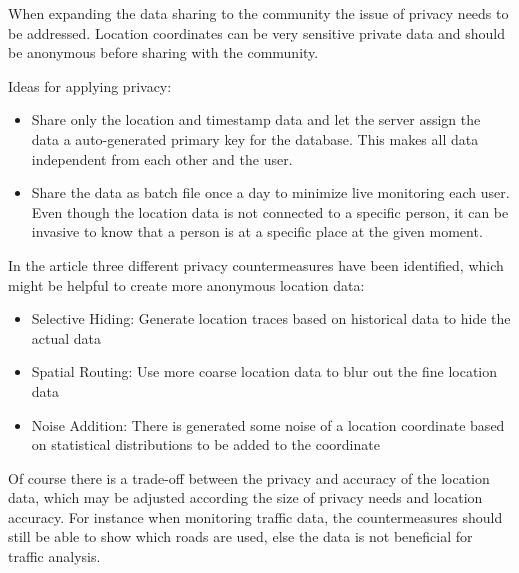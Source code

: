 When expanding the data sharing to the community the issue of privacy needs to be addressed. Location coordinates can be very sensitive private data and should be anonymous before sharing with the community.  

Ideas for applying privacy:
\begin{itemize}
    \item Share only the location and timestamp data and let the server assign the data a auto-generated primary key for the database. This makes all data independent from each other and the user.
    \item Share the data as batch file once a day to minimize live monitoring each user. Even though the location data is not connected to a specific person, it can be invasive to know that a person is at a specific place at the given moment.
\end{itemize}

In the article \cite{Mun2009} three different privacy countermeasures have been identified, which might be helpful to create more anonymous location data:
\begin{itemize}
    \item Selective Hiding: Generate location traces based on historical data to hide the actual data
    \item Spatial Routing: Use more coarse location data to blur out the fine location data
    \item Noise Addition: There is generated some noise of a location coordinate based on statistical distributions to be added to the coordinate
\end{itemize}

Of course there is a trade-off between the privacy and accuracy of the location data, which may be adjusted according the size of privacy needs and location accuracy. For instance when monitoring traffic data, the countermeasures should still be able to show which roads are used, else the data is not beneficial for traffic analysis.
